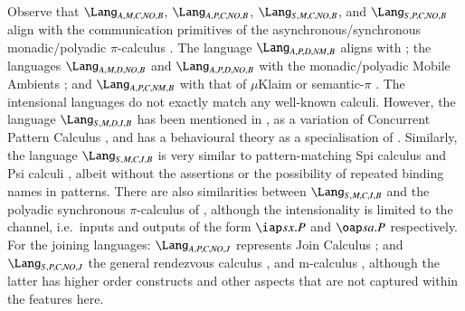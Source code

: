 \documentclass[submission,copyright,creativecommons]{eptcs}
\begin{document}
Observe that $\Lang_{A,M,C,\mathit{NO},B}$, $\Lang_{A,P,C,\mathit{NO},B}$, $\Lang_{S,M,C,\mathit{NO},B}$, and $\Lang_{S,P,C,\mathit{NO},B}$
align with the communication
primitives of the asynchronous/synchronous monadic/polyadic $\pi$-calculus
\cite{Milner:1992:CMP:162037.162038,Milner:1992:CMP:162037.162039,milner:polyadic-tutorial}.
The language $\Lang_{A,P,D,\mathit{NM},B}$ aligns with \Linda \cite{Gel85};
the languages $\Lang_{A,M,D,\mathit{NO},B}$ and $\Lang_{A,P,D,\mathit{NO},B}$ with the monadic/polyadic Mobile Ambients \cite{DBLP:conf/fossacs/CardelliG98};
and $\Lang_{A,P,C,\mathit{NM},B}$ with that of $\mu${\sc Klaim} \cite{10.1109/32.685256} or semantic-$\pi$ \cite{Castagna:2008:SSP:1367144.1367262}.
The intensional languages do not exactly match any well-known calculi.
However,
the language $\Lang_{S,M,D,I,B}$ has been mentioned in \cite{GivenWilsonPHD}, as a variation of Concurrent Pattern Calculus \cite{GivenWilsonGorlaJay10,GivenWilsonPHD},
and has a behavioural theory as a specialisation of \cite{GivenWilsonGorla13}.
Similarly, the language $\Lang_{S,M,C,I,B}$ is very similar to pattern-matching Spi calculus
\cite{Haack:2006:PS:1165126.1165127}
and Psi calculi \cite{BJPV11},
albeit without the assertions or the possibility of repeated binding names in patterns.
There are also similarities between $\Lang_{S,M,C,I,B}$ and the polyadic synchronous $\pi$-calculus of
\cite{Carbone:2003:EPP:941344.941346}, although the intensionality is limited to the
channel, i.e.~inputs and outputs of the form $\iap s x.P$ and $\oap s a.P$ respectively.
For the joining languages:
$\Lang_{A,P,C,\mathit{NO},J}$ represents Join Calculus \cite{Fournet_thereflexive};
and $\Lang_{S,P,C,\mathit{NO},J}$ the general rendezvous calculus \cite{Bocchi2004119},
and m-calculus \cite{DBLP:conf/popl/SchmittS03}, although the latter has higher order constructs and
other aspects that are not captured within the features here.
\end{document}

